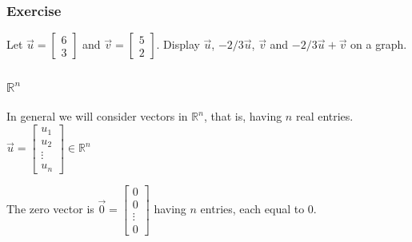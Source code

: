 \begin{frame}[fragile]\frametitle{Exercise}

     Let $\vec{u} = \left[\begin{array}{r} 6 \\3 \end{array}\right]$
    and $\vec{v} = \left[\begin{array}{r} 5 \\2 \end{array}\right]$.  Display 
    $\vec{u}$, $-2/3\vec{u}$, $\vec{v}$ and $-2/3\vec{u} + \vec{v}$
    on a graph.
  
\end{frame}

  \begin{frame}[fragile]\frametitle{ $\mathbb R^n$}
In general we will consider vectors in $\mathbb R^n$, that is, having $n$ real entries.
$
 \vec{u} = \left[\begin{array}{r} u_1 \\ u_2\\ \vdots \\ u_n \end{array}\right] \in \mathbb R^n
$

The zero vector is $\vec{0} = \left[\begin{array}{r} 0 \\ 0 \\ \vdots \\ 0 \end{array}\right]$
having $n$ entries, each equal to $0$.
\end{frame}

